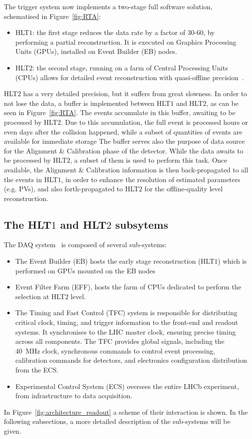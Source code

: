 The trigger system now implements a two-stage full software solution, schematised in Figure~\ref{fig:RTA}:
\begin{itemize}
\item HLT$1$: the first stage reduces the data rate by a factor of 30-60, by performing a partial reconstruction. It is executed on Graphics Processing Units (GPUs), installed on Event Builder (EB) nodes.
\item HLT$2$: the second stage, running on a farm of Central Processing Units (CPUs) allows for detailed event reconstruction with quasi-offline precision~\cite{Gazzoni:2670650}.
\end{itemize}
HLT$2$ has a very detailed precision, but it suffers from great slowness. In order to not lose the data, a buffer is implemented between HLT$1$ and HLT$2$, as can be seen in Figure~\ref{fig:RTA}. The events accumulate in this buffer, awaiting to be processed by HLT$2$. Due to this accumulation, the full event is processed hours or even days after the collision happened, while a subset of quantities of events are available for immediate storage 
The buffer serves also the purpose of data source for the Alignment \& Calibration phase of the detector. While the data awaits to be processed by HLT$2$, a subset of them is used to perform this task. Once available, the Alignment \& Calibration information is then back-propagated to all the events in HLT$1$, in order to enhance the resolution of estimated parameters (e.g. PVs), and also forth-propagated to HLT$2$ for the offline-quality level reconstruction.


\subsection{The HLT$1$ and HLT$2$ subsytems}
The DAQ system~\cite{CERN-LHCC-2014-016} is composed of several sub-systems:
\begin{itemize}
\item The Event Builder (EB) hosts the early stage reconstruction (HLT$1$) which is performed on GPUs mounted on the EB nodes
\item Event Filter Farm (EFF), hosts the farm of CPUs dedicated to perform the selection at HLT$2$ level.
\item The Timing and Fast Control (TFC) system is responsible for distributing critical clock, timing, and trigger information to the front-end and readout systems. It synchronises to the LHC master clock, ensuring precise timing across all components. The TFC provides global signals, including the \SI{40}{\mega\hertz} clock, synchronous commands to control event processing, calibration commands for detectors, and electronics configuration distribution from the ECS.
\item Experimental Control System (ECS) oversees the entire LHCb experiment, from infrastructure to data acquisition.
\end{itemize}
In Figure~\ref{fig:architecture_readout} a scheme of their interaction is shown. In the following subsections, a more detailed description of the sub-systems will be given.

